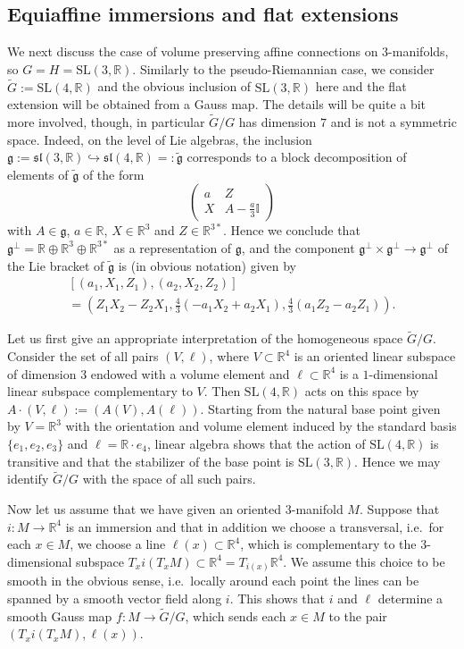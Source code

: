 \documentclass[british,11pt,a4paper]{amsart}
\numberwithin{equation}{section}
\renewcommand\frak{\mathfrak}
\renewcommand\Bbb{\mathbb}
\newcommand{\x}{\times}
\newcommand{\deq}{:=}
\newcommand{\tfg}{\widetilde{\mathfrak g}}
\newcommand*{\R}{\mathbb{R}}
\newcommand{\col}{:}
\numberwithin{theorem}{section}
\theoremstyle{definition}
\theoremstyle{remark}
\begin{document}
\subsection{Equiaffine immersions and flat extensions}\label{1.8}
We next discuss the case of volume preserving affine connections on $3$-manifolds,
so $G=H=\mathrm{SL}(3,\R)$. Similarly to the pseudo-Riemannian case, we consider
$\widetilde{G}\deq\mathrm{SL}(4,\R)$ and the obvious inclusion of
$\mathrm{SL}(3,\R)$ here and the flat extension will be obtained from a Gauss
map. The details will be quite a bit more involved, though, in particular $\tilde
G/G$ has dimension $7$ and is not a symmetric space. Indeed, on the level of Lie
algebras, the inclusion $\frak g\deq\frak{sl}(3,\R)\hookrightarrow
\frak{sl}(4,\R)=:\tfg$ corresponds to a block decomposition of elements of $\tfg$ of
the form
\[
 \begin{pmatrix} a & Z \\ X & A-\tfrac{a}{3}\Bbb
    I\end{pmatrix}
\] 
with $A\in\frak{g}$, $a\in\R$, $X\in\R^3$ and
$Z\in\R^{3*}$. Hence we conclude that $\frak{g}^\perp=\Bbb R\oplus\R^3\oplus\R^{3*}$
as a representation of $\frak{g}$, and the component
$\frak{g}^\perp\x\frak{g}^\perp\to\frak{g}^\perp$ of the Lie bracket of $\tfg$ is (in
obvious notation) given by
\begin{multline}\label{eq:non-symm}
[(a_1,X_1,Z_1),(a_2,X_2,Z_2)]\\
=(Z_1X_2-Z_2X_1,\frac43(-a_1X_2+a_2X_1),\frac43(a_1Z_2-a_2Z_1)). 
\end{multline}

Let us first give an appropriate interpretation of the homogeneous space $\tilde
G/G$. Consider the set of all pairs $(V,\ell)$, where $V\subset\R^4$ is an
oriented linear subspace of dimension $3$ endowed with a volume element and
$\ell\subset\R^4$ is a $1$-dimensional linear subspace complementary to $V$.
Then $\mathrm{SL}(4,\R)$ acts on this space by $A\cdot (V,\ell)\deq(A(V),A(\ell))$. Starting
from the natural base point given by $V=\R^3$ with the orientation and volume
element induced by the standard basis $\{e_1,e_2,e_3\}$ and $\ell=\R\cdot e_4$,
linear algebra shows that the action of $\mathrm{SL}(4,\R)$ is transitive and that the
stabilizer of the base point is $\mathrm{SL}(3,\R)$. Hence we may identify $\tilde G/G$
with the space of all such pairs.

Now let us assume that we have given an oriented $3$-manifold $M$. Suppose that
$i\col M\to\R^4$ is an immersion and that in addition we choose a transversal,
i.e.~for each $x\in M$, we choose a line $\ell(x)\subset\Bbb R^4$, which is
complementary to the $3$-dimensional subspace $T_xi(T_xM)\subset\Bbb
R^4=T_{i(x)}\R^4$. We assume this choice to be smooth in the obvious sense,
i.e.~locally around each point the lines can be spanned by a smooth vector field
along $i$. This shows that $i$ and $\ell$ determine a smooth Gauss map $f\col
M\to\tilde G/G$, which sends each $x\in M$ to the pair $(T_xi(T_xM),\ell(x))$.
\end{document}
